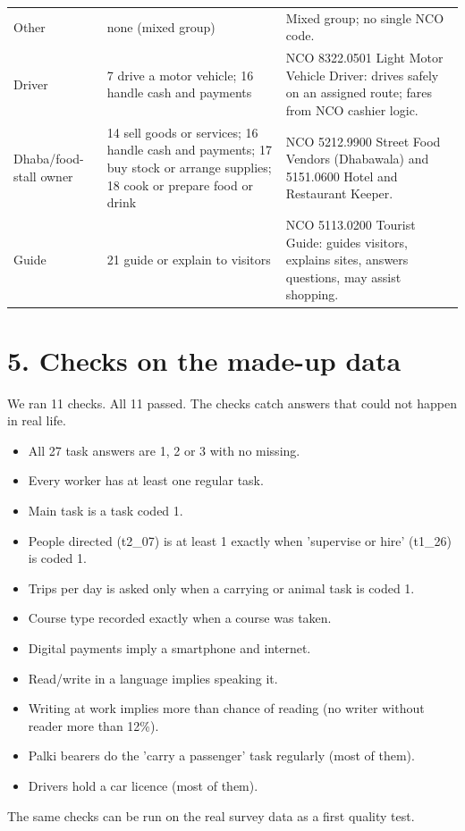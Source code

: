 \documentclass[11pt]{article}
\begin{document}
{\begin{longtable}{p{2.7cm}p{5.6cm}p{6.5cm}}
Other & none (mixed group) & Mixed group; no single NCO code. \\
Driver & 7 drive a motor vehicle; 16 handle cash and payments & NCO 8322.0501 Light Motor Vehicle Driver: drives safely on an assigned route; fares from NCO cashier logic. \\
Dhaba/food-stall owner & 14 sell goods or services; 16 handle cash and payments; 17 buy stock or arrange supplies; 18 cook or prepare food or drink & NCO 5212.9900 Street Food Vendors (Dhabawala) and 5151.0600 Hotel and Restaurant Keeper. \\
Guide & 21 guide or explain to visitors & NCO 5113.0200 Tourist Guide: guides visitors, explains sites, answers questions, may assist shopping. \\
\bottomrule
\end{longtable}
}

\section*{5. Checks on the made-up data}
We ran 11 checks. All 11 passed. The checks catch answers that could not happen in real life.
\begin{itemize}[leftmargin=1.2em,itemsep=1pt]
\item All 27 task answers are 1, 2 or 3 with no missing.
\item Every worker has at least one regular task.
\item Main task is a task coded 1.
\item People directed (t2\_07) is at least 1 exactly when 'supervise or hire' (t1\_26) is coded 1.
\item Trips per day is asked only when a carrying or animal task is coded 1.
\item Course type recorded exactly when a course was taken.
\item Digital payments imply a smartphone and internet.
\item Read/write in a language implies speaking it.
\item Writing at work implies more than chance of reading (no writer without reader more than 12\%).
\item Palki bearers do the 'carry a passenger' task regularly (most of them).
\item Drivers hold a car licence (most of them).
\end{itemize}
The same checks can be run on the real survey data as a first quality test.
\end{document}
